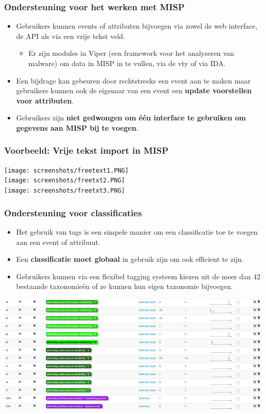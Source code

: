 \begin{frame}
        \frametitle{Ondersteuning voor het werken met MISP}
        \begin{itemize}
            \item Gebruikers kunnen events of attributen bijvoegen via zowel de web interface, de API als via een vrije tekst veld.
                \begin{itemize}
                        \item Er zijn modules in Viper (een framework voor het analyseren van malware) om data in MISP in te vullen, via de vty of via IDA.
                \end{itemize}
        \item Een bijdrage kan gebeuren door rechtstreeks een event aan te maken maar gebruikers kunnen ook de eigenaar van een event een {\bf update voorstellen voor attributen}.
            \item Gebruikers zijn {\bf niet gedwongen om één interface te gebruiken om gegevens aan MISP bij te voegen}.
        \end{itemize}
\end{frame}

\begin{frame}
        \frametitle{Voorbeeld: Vrije tekst import in MISP}
        \texttt{[image: screenshots/freetext1.PNG]}\\
        \texttt{[image: screenshots/freetxt2.PNG]}\\
        \texttt{[image: screenshots/freetxt3.PNG]}
\end{frame}

\begin{frame}
        \frametitle{Ondersteuning voor classificaties}
        \begin{itemize}
          \item Het gebruik van tags is een simpele manier om een classificatie toe te voegen aan een event of attribuut.
          \item Een {\bf classificatie moet globaal} in gebruik zijn om ook efficient te zijn.
          \item Gebruikers kunnen via een flexibel tagging systeem kiezen uit de meer dan 42 bestaande taxonomieën of ze kunnen hun eigen taxonomie bijvoegen.
        \end{itemize}
        \includegraphics[scale=0.20]{tags-2-4-70.png}
\end{frame}

